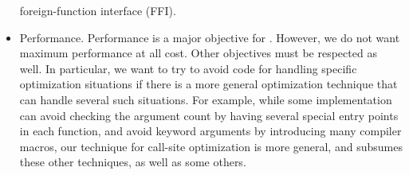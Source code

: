 \begin{itemize}
  foreign-function interface (FFI).
\item Performance.  Performance is a major objective for \sysname{}.
  However, we do not want maximum performance at all cost.  Other
  objectives must be respected as well.  In particular, we want to try
  to avoid code for handling specific optimization situations if there
  is a more general optimization technique that can handle several
  such situations.  For example, while some \commonlisp{}
  implementation can avoid checking the argument count by having
  several special entry points in each function, and avoid keyword
  arguments by introducing many compiler macros, our technique for
  call-site optimization is more general, and subsumes these other
  techniques, as well as some others.
\end{itemize}
